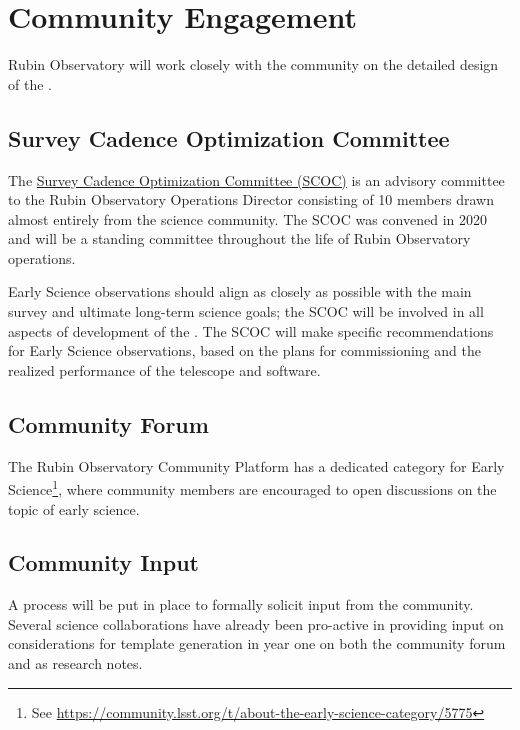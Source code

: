 \section{Community Engagement}

Rubin Observatory will work closely with the community on the detailed design of the \esp. 

\subsection{Survey Cadence Optimization Committee}
The \href{https://www.lsst.org/content/charge-survey-cadence-optimization-committee-scoc}{Survey Cadence Optimization Committee (SCOC)} is an advisory committee to the Rubin Observatory Operations Director consisting of 10 members drawn almost entirely from the science community.
The SCOC was convened in 2020 and will be a standing committee throughout the life of Rubin Observatory operations. 

Early Science observations should align as closely as possible with the main survey and ultimate long-term science goals; the SCOC will be involved in all aspects of development of the \esp. 
The SCOC will make specific recommendations for Early Science observations, based on the plans for commissioning and the realized performance of the telescope and software. 


\subsection{Community Forum}

The Rubin Observatory Community Platform has a dedicated category for Early Science\footnote{ See \url{https://community.lsst.org/t/about-the-early-science-category/5775}}, where community members are encouraged to open discussions on the topic of early science. 

\subsection{Community Input}

A process will be put in place to formally solicit input from the community. 
Several science collaborations have already been pro-active in providing input on considerations for template generation in year one on both the community forum and as research notes.